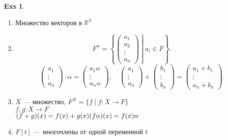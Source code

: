 \documentclass[11pt]{book}
\newcommand{\R}{\mathbb{R}}
\theoremstyle{definition}
\theoremstyle{plain}
\theoremstyle{plain}
\theoremstyle{definition}
\newtheorem*{exs}{Exs}
\theoremstyle{remark}
\begin{document}
\begin{exs}
    $ $
    \begin{enumerate}
	\item Множество векторов в $\R ^3$
	\item \[
		F^{n} = \left\{
		    \begin{pmatrix}
			a_1 \\ a_2 \\ \vdots \\ a_{n}
		    \end{pmatrix}
		    \middle| a_i \in  F
		\right\}
	    .\]
	    \[
		\begin{pmatrix}
		    a_1 \\ \vdots \\ a_n
		\end{pmatrix}
		\cdot \alpha  =
		\begin{pmatrix}
		    a_1\alpha \\ \vdots \\ a_n \alpha
		\end{pmatrix}
		, \quad
		\begin{pmatrix}
		    a_1 \\ \vdots \\ a_n
		\end{pmatrix}
		+
		\begin{pmatrix}
		    b_1 \\ \vdots \\ b_n
		\end{pmatrix}
		=
		\begin{pmatrix}
		    a_1 + b_1 \\ \vdots \\ a_n + b_n
		\end{pmatrix}
	    .\]
	\item $X$ --- множество, $F^X = \{f \mid f:X \to F\}$ \\
	    $f, g: X \to F$\\
	    $(f+g)(x) = f(x) + g(x)\\ (f \alpha) (x) = f(x)\alpha$
	\item $F[t]$ --- многочлены от одной переменной $t$
    \end{enumerate}
\end{exs}
\end{document}
